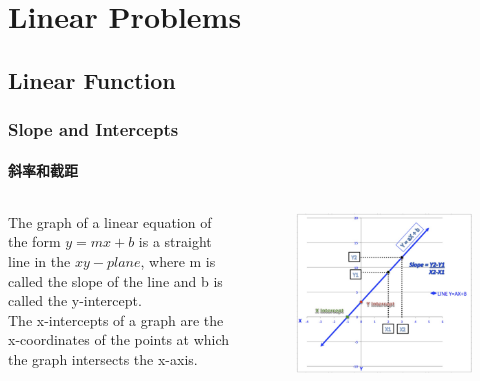 \documentclass[
	11pt, %
]{beamer}
\begin{document}

 \section{Linear Problems}


\subsection{Linear Function}


\begin{frame}
	\frametitle{Slope and Intercepts}
	\framesubtitle{斜率和截距}

	\begin{columns}[t] 
		\begin{column}{0.4\textwidth} %
			\begin{definition}
						The graph of a linear equation of the form $y = mx + b$ is a straight line
				in the $xy-plane$, where m is called the \alert{slope} of the line and b is called the \alert{y-intercept}. \\
				The x-intercepts of a graph are the \alert{x-coordinates} of the points at which the graph intersects the x-axis.
			\end{definition}
		\end{column}
		\begin{column}{0.6\textwidth} %
			\begin{figure}
				\includegraphics[width=\linewidth]{how-to-calculate-slope-and-intercepts-of-a-line-thumb-mMPHze60u.jpeg}
			\end{figure}
    \end{column}
	\end{columns}
\end{frame}
\end{document}
